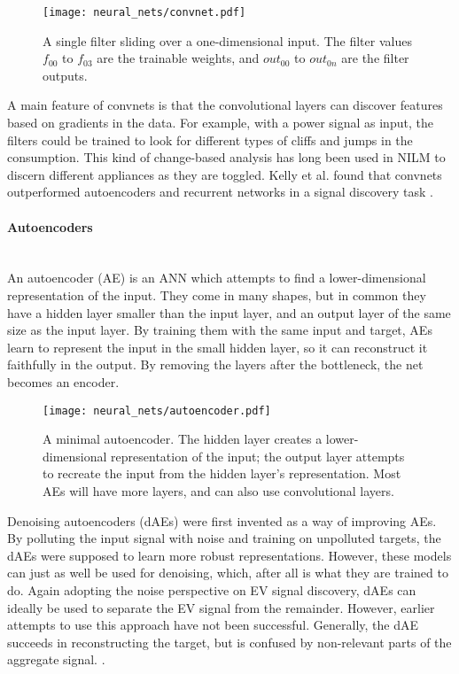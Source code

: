 \documentclass[12pt, american]{article}
\begin{document}
\begin{figure}[h]
\centering
\caption{A single filter sliding over a one-dimensional input. The filter values $f_{00}$ to $f_{03}$ are the trainable weights, and $out_{00}$ to $out_{0n}$ are the filter outputs.}
\texttt{[image: neural\_nets/convnet.pdf]}
\label{fig:convnet}
\end{figure}

A main feature of convnets is that the convolutional layers can discover features based on gradients in the data. For example, with a power signal as input, the filters could be trained to look for different types of cliffs and jumps in the consumption. This kind of change-based analysis has long been used in NILM to discern different appliances as they are toggled\cite{Hart1992,Sultanem1991}. Kelly et al. found that convnets outperformed autoencoders and recurrent networks in a signal discovery task \cite{Kelly2015c}.

\paragraph{Autoencoders}\mbox{}\\

\noindent An autoencoder (AE) is an ANN which attempts to find a lower-dimensional representation of the input. They come in many shapes, but in common they have a hidden layer smaller than the input layer, and an output layer of the same size as the input layer. By training them with the same input and target, AEs learn to represent the input in the small hidden layer, so it can reconstruct it faithfully in the output. By removing the layers after the bottleneck, the net becomes an encoder.

\begin{figure}[h]
\centering
\caption{A minimal autoencoder. The hidden layer creates a lower-dimensional representation of the input; the output layer attempts to recreate the input from the hidden layer's representation. Most AEs will have more layers, and can also use convolutional layers.}
\texttt{[image: neural\_nets/autoencoder.pdf]}
\label{fig:autoencoder}
\end{figure}

Denoising autoencoders (dAEs) were first invented as a way of improving AEs. By polluting the input signal with noise and training on unpolluted targets, the dAEs were supposed to learn more robust representations. However, these models can just as well be used for denoising, which, after all is what they are trained to do. Again adopting the noise perspective on EV signal discovery, dAEs can ideally be used to separate the EV signal from the remainder. However, earlier attempts to use this approach have not been successful. Generally, the dAE succeeds in reconstructing the target, but is confused by non-relevant parts of the aggregate signal. \cite{Kelly2015c}.
\end{document}
